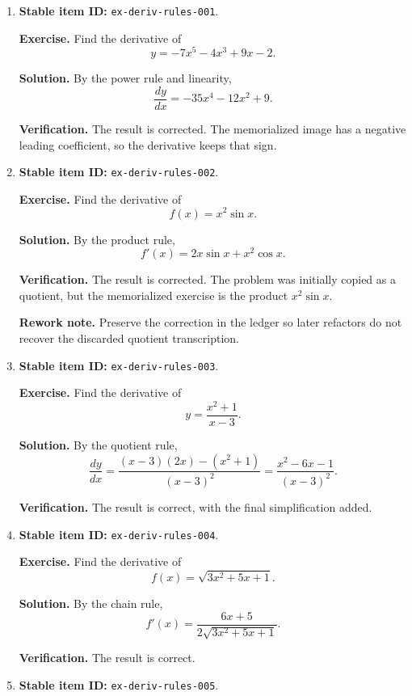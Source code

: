 \begin{enumerate}
  \item \textbf{Stable item ID:} \texttt{ex-deriv-rules-001}.

  \textbf{Exercise.}
  Find the derivative of
  \[
    y = -7x^5 - 4x^3 + 9x - 2.
  \]

  \textbf{Solution.}
  By the power rule and linearity,
  \[
    \frac{dy}{dx}
      = -35x^4 - 12x^2 + 9.
  \]

  \textbf{Verification.}
  The result is corrected. The memorialized image has a negative leading
  coefficient, so the derivative keeps that sign.

  \item \textbf{Stable item ID:} \texttt{ex-deriv-rules-002}.

  \textbf{Exercise.}
  Find the derivative of
  \[
    f(x) = x^2 \sin x.
  \]

  \textbf{Solution.}
  By the product rule,
  \[
    f'(x) = 2x\sin x + x^2\cos x.
  \]

  \textbf{Verification.}
  The result is corrected. The problem was initially copied as a quotient, but
  the memorialized exercise is the product \(x^2\sin x\).

  \textbf{Rework note.}
  Preserve the correction in the ledger so later refactors do not recover the
  discarded quotient transcription.

  \item \textbf{Stable item ID:} \texttt{ex-deriv-rules-003}.

  \textbf{Exercise.}
  Find the derivative of
  \[
    y = \frac{x^2 + 1}{x - 3}.
  \]

  \textbf{Solution.}
  By the quotient rule,
  \[
    \frac{dy}{dx}
      =
      \frac{(x - 3)(2x) - (x^2 + 1)}{(x - 3)^2}
      =
      \frac{x^2 - 6x - 1}{(x - 3)^2}.
  \]

  \textbf{Verification.}
  The result is correct, with the final simplification added.

  \item \textbf{Stable item ID:} \texttt{ex-deriv-rules-004}.

  \textbf{Exercise.}
  Find the derivative of
  \[
    f(x) = \sqrt{3x^2 + 5x + 1}.
  \]

  \textbf{Solution.}
  By the chain rule,
  \[
    f'(x)
      =
      \frac{6x + 5}{2\sqrt{3x^2 + 5x + 1}}.
  \]

  \textbf{Verification.}
  The result is correct.

  \item \textbf{Stable item ID:} \texttt{ex-deriv-rules-005}.


\end{enumerate}
